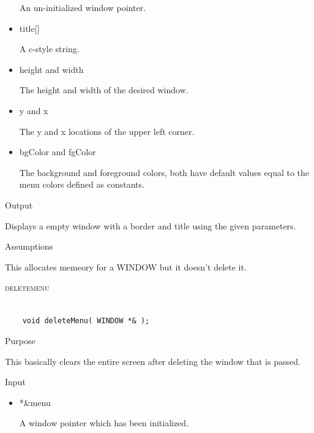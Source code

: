 \documentclass[pdftex, 11pt]{article}
\begin{document}
\begin{description}
\begin{description}
\begin{itemize}
						An un-initialized window pointer.

					\item{title[]}

						A c-style string.

					\item{height and width}

						The height and width of the desired window.

					\item{y and x}

						The y and x locations of the upper left corner.

					\item{bgColor and fgColor}

						The background and foreground colors, both have default values equal
						to the menu colors defined as constants.

				\end{itemize}

			\item{Output}

				Displays a empty window with a border and title using the
				given parameters.

			\item{Assumptions}

				This allocates memeory for a WINDOW but it doesn't delete it.

		\end{description}


	\item{\textsc{deletemenu}}

		\begin{lstlisting}

	void deleteMenu( WINDOW *& );
		\end{lstlisting}

		\begin{description}
			\item{Purpose}

				This basically clears the entire screen after deleting the window that is
				passed.

			\item{Input}

				\begin{itemize}

					\item{*\&menu}

						A window pointer which has been initialized.	

				\end{itemize}


\end{description}
\end{description}
\end{document}
